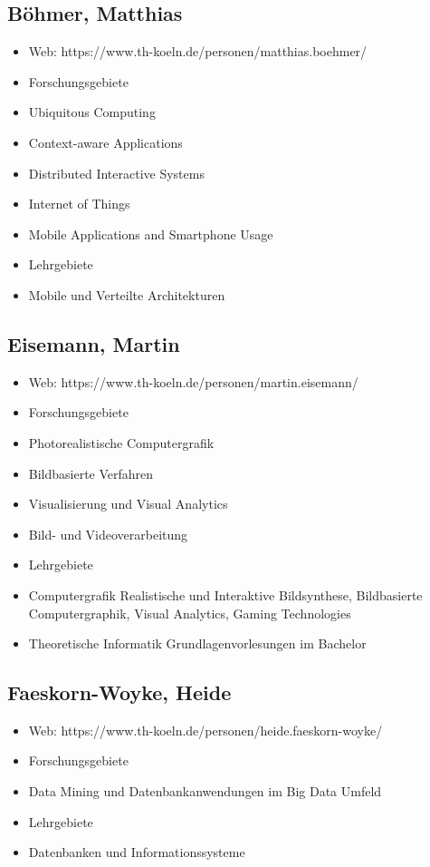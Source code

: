 \subsection{Böhmer, Matthias}\label{buxf6hmer-matthias}

\begin{itemize}
\item
  Web: https://www.th-koeln.de/personen/matthias.boehmer/
\item
  Forschungsgebiete
\item
  Ubiquitous Computing
\item
  Context-aware Applications
\item
  Distributed Interactive Systems
\item
  Internet of Things
\item
  Mobile Applications and Smartphone Usage
\item
  Lehrgebiete
\item
  Mobile und Verteilte Architekturen
\end{itemize}

\subsection{Eisemann, Martin}\label{eisemann-martin}

\begin{itemize}
\item
  Web: https://www.th-koeln.de/personen/martin.eisemann/
\item
  Forschungsgebiete
\item
  Photorealistische Computergrafik
\item
  Bildbasierte Verfahren
\item
  Visualisierung und Visual Analytics
\item
  Bild- und Videoverarbeitung
\item
  Lehrgebiete
\item
  Computergrafik Realistische und Interaktive Bildsynthese, Bildbasierte
  Computergraphik, Visual Analytics, Gaming Technologies
\item
  Theoretische Informatik Grundlagenvorlesungen im Bachelor
\end{itemize}

\subsection{Faeskorn-Woyke, Heide}\label{faeskorn-woyke-heide}

\begin{itemize}
\item
  Web: https://www.th-koeln.de/personen/heide.faeskorn-woyke/
\item
  Forschungsgebiete
\item
  Data Mining und Datenbankanwendungen im Big Data Umfeld
\item
  Lehrgebiete
\item
  Datenbanken und Informationssysteme
\end{itemize}


